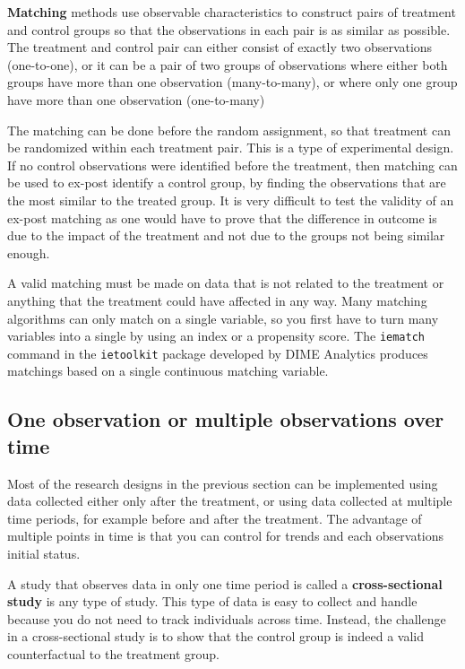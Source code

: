 
\textbf{Matching}
methods use observable characteristics to construct pairs of treatment and control groups
so that the observations in each pair is as similar as possible. 
The treatment and control pair can either consist of exactly two observations (one-to-one),
or it can be a pair of two groups of observations where either both groups have more than one observation (many-to-many),
or where only one group have more than one observation (one-to-many)

The matching can be done before the random assignment, 
so that treatment can be randomized within each treatment pair. 
This is a type of experimental design. 
If no control observations were identified before the treatment, 
then matching can be used to ex-post identify a control group, 
by finding the observations that are the most similar to the treated group.
It is very difficult to test the validity of an ex-post matching 
as one would have to prove that the difference in outcome is 
due to the impact of the treatment and not due to the groups not being similar enough.

A valid matching must be made on data that is not related to the treatment 
or anything that the treatment could have affected in any way. 
Many matching algorithms can only match on a single variable, 
so you first have to turn many variables into a single by using an index or a propensity score.
The \texttt{iematch} command in the \texttt{ietoolkit} package developed by DIME Analytics 
produces matchings based on a single continuous matching variable.




\subsection{One observation or multiple observations over time}

Most of the research designs in the previous section can be implemented 
using data collected either only after the treatment, 
or using data collected at multiple time periods, 
for example before and after the treatment. 
The advantage of multiple points in time is 
that you can control for trends and each observations initial status.

A study that observes data in only one time period is called 
a \textbf{cross-sectional study} is any type of study. 
This type of data is easy to collect and handle because
you do not need to track individuals across time. 
Instead, the challenge in a cross-sectional study is to
show that the control group is indeed a valid counterfactual to the treatment group.

